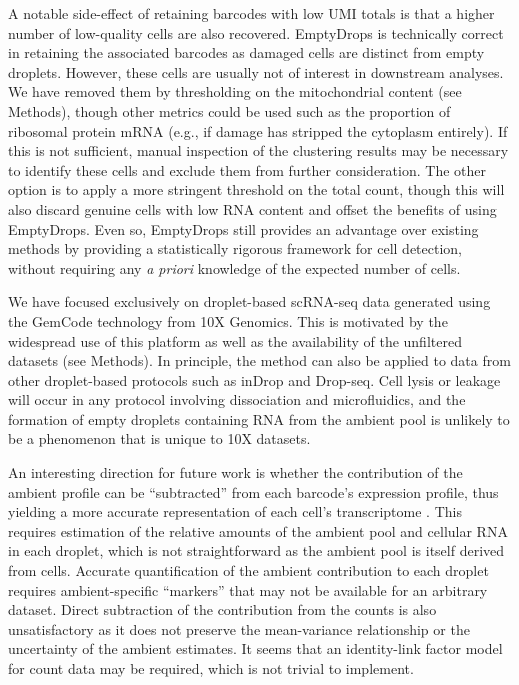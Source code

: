 \documentclass[10pt,letterpaper]{article}
\begin{document}
A notable side-effect of retaining barcodes with low UMI totals is that a higher number of low-quality cells are also recovered.
EmptyDrops is technically correct in retaining the associated barcodes as damaged cells are distinct from empty droplets.
However, these cells are usually not of interest in downstream analyses. 
We have removed them by thresholding on the mitochondrial content (see Methods), though other metrics could be used such as the proportion of ribosomal protein mRNA (e.g., if damage has stripped the cytoplasm entirely).
If this is not sufficient, manual inspection of the clustering results may be necessary to identify these cells and exclude them from further consideration.
The other option is to apply a more stringent threshold on the total count, though this will also discard genuine cells with low RNA content and offset the benefits of using EmptyDrops.
Even so, EmptyDrops still provides an advantage over existing methods by providing a statistically rigorous framework for cell detection, 
without requiring any \textit{a priori} knowledge of the expected number of cells.

We have focused exclusively on droplet-based scRNA-seq data generated using the GemCode technology from 10X Genomics.
This is motivated by the widespread use of this platform as well as the availability of the unfiltered datasets (see Methods).
In principle, the method can also be applied to data from other droplet-based protocols such as inDrop and Drop-seq. 
Cell lysis or leakage will occur in any protocol involving dissociation and microfluidics,
and the formation of empty droplets containing RNA from the ambient pool is unlikely to be a phenomenon that is unique to 10X datasets.

An interesting direction for future work is whether the contribution of the ambient profile can be ``subtracted'' from each barcode's expression profile, thus yielding a more accurate representation of each cell's transcriptome \cite{young2018soupx}.
This requires estimation of the relative amounts of the ambient pool and cellular RNA in each droplet,
which is not straightforward as the ambient pool is itself derived from cells.
Accurate quantification of the ambient contribution to each droplet requires ambient-specific ``markers'' that may not be available for an arbitrary dataset.
Direct subtraction of the contribution from the counts is also unsatisfactory as it does not preserve the mean-variance relationship or the uncertainty of the ambient estimates.
It seems that an identity-link factor model for count data may be required, which is not trivial to implement. 
\end{document}
